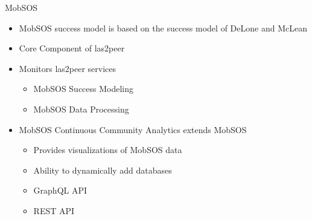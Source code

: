 \begin{frame}{MobSOS}

  \begin{itemize}
    \item MobSOS success model is based on the success model of DeLone and McLean
    \item Core Component of las2peer
    \item Monitors las2peer services
    \begin{itemize}
        \item MobSOS Success Modeling
        \item MobSOS Data Processing
    \end{itemize}
    \item MobSOS Continuous Community Analytics \cite{Kers20} extends MobSOS
          \begin{itemize}
            \item Provides visualizations of MobSOS data
            \item Ability to dynamically add databases
            \item GraphQL API
            \item REST API
          \end{itemize}
  \end{itemize}
\end{frame}



